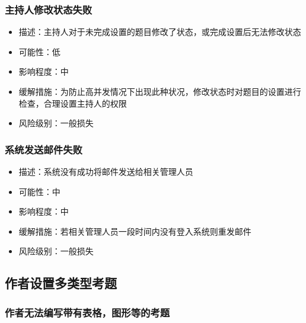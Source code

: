 \documentclass[hyperref, a4paper]{ctexart}
\providecommand{\tightlist}{%
  \setlength{\itemsep}{0pt}\setlength{\parskip}{0pt}}
\begin{document}
\hypertarget{ux4e3bux6301ux4ebaux4feeux6539ux72b6ux6001ux5931ux8d25}{%
\subsubsection{主持人修改状态失败}\label{ux4e3bux6301ux4ebaux4feeux6539ux72b6ux6001ux5931ux8d25}}

\begin{itemize}
\tightlist
\item
  描述：主持人对于未完成设置的题目修改了状态，或完成设置后无法修改状态
\item
  可能性：低
\item
  影响程度：中
\item
  缓解措施：为防止高并发情况下出现此种状况，修改状态时对题目的设置进行检查，合理设置主持人的权限
\item
  风险级别：一般损失
\end{itemize}

\hypertarget{ux7cfbux7edfux53d1ux9001ux90aeux4ef6ux5931ux8d25-1}{%
\subsubsection{系统发送邮件失败}\label{ux7cfbux7edfux53d1ux9001ux90aeux4ef6ux5931ux8d25-1}}

\begin{itemize}
\tightlist
\item
  描述：系统没有成功将邮件发送给相关管理人员
\item
  可能性：中
\item
  影响程度：中
\item
  缓解措施：若相关管理人员一段时间内没有登入系统则重发邮件
\item
  风险级别：一般损失
\end{itemize}

\hypertarget{ux4f5cux8005ux8bbeux7f6eux591aux7c7bux578bux8003ux9898-1}{%
\subsection{作者设置多类型考题}\label{ux4f5cux8005ux8bbeux7f6eux591aux7c7bux578bux8003ux9898-1}}

\hypertarget{ux4f5cux8005ux65e0ux6cd5ux7f16ux5199ux5e26ux6709ux8868ux683cux56feux5f62ux7b49ux7684ux8003ux9898}{%
\subsubsection{作者无法编写带有表格，图形等的考题}\label{ux4f5cux8005ux65e0ux6cd5ux7f16ux5199ux5e26ux6709ux8868ux683cux56feux5f62ux7b49ux7684ux8003ux9898}}
\end{document}
